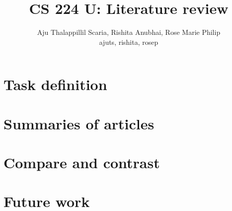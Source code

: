 \documentclass[letterpaper]{article}
\begin{document}
\title{
CS 224 U: Literature review
}

\author{
Aju Thalappillil Scaria, Rishita Anubhai, Rose Marie Philip \\
ajuts, rishita, rosep
}

\maketitle


%

\section{Task definition}
\label{sec:intro}


\section{Summaries of articles}
\label{sec:summary}




\section{Compare and contrast}
\label{sec:compare}




\section{Future work}
\label{sec:future}





%
\end{document}
